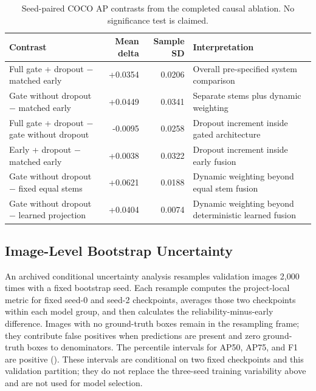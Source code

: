 \begin{table}[t]
\centering
\caption{Seed-paired COCO AP contrasts from the completed causal ablation. No significance test is claimed.}
\label{tab:causal-contrasts}
\scriptsize
\begin{tabularx}{\textwidth}{@{}YrrY@{}}
\toprule
Contrast & Mean delta & Sample SD & Interpretation\\
\midrule
Full gate + dropout $-$ matched early & +0.0354 & 0.0206 & Overall pre-specified system comparison\\
Gate without dropout $-$ matched early & +0.0449 & 0.0341 & Separate stems plus dynamic weighting\\
Full gate + dropout $-$ gate without dropout & -0.0095 & 0.0258 & Dropout increment inside gated architecture\\
Early + dropout $-$ matched early & +0.0038 & 0.0322 & Dropout increment inside early fusion\\
Gate without dropout $-$ fixed equal stems & +0.0621 & 0.0188 & Dynamic weighting beyond equal stem fusion\\
Gate without dropout $-$ learned projection & +0.0404 & 0.0074 & Dynamic weighting beyond deterministic learned fusion\\
\bottomrule
\end{tabularx}
\end{table}

\subsection{Image-Level Bootstrap Uncertainty}
An archived conditional uncertainty analysis resamples validation images 2,000 times with a fixed bootstrap seed. Each resample computes the project-local metric for fixed seed-0 and seed-2 checkpoints, averages those two checkpoints within each model group, and then calculates the reliability-minus-early difference. Images with no ground-truth boxes remain in the resampling frame; they contribute false positives when predictions are present and zero ground-truth boxes to denominators. The percentile intervals for AP50, AP75, and F1 are positive (). These intervals are conditional on two fixed checkpoints and this validation partition; they do not replace the three-seed training variability above and are not used for model selection.
